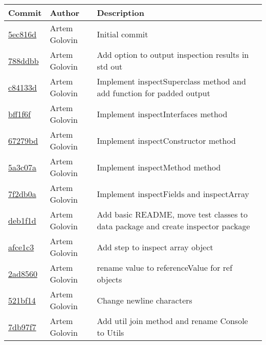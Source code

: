 \begin{tabularx}{\textwidth}{l l X}\textbf{Commit} & \textbf{Author} & \textbf{Description}\\ \hline
\href{https://github.com/awave1/ObjectInspector/commit/5ec816dfc0e519d694f6da56351a2e67b482ec35}{5ec816d} & Artem Golovin & Initial commit\\ \hline
\href{https://github.com/awave1/ObjectInspector/commit/788ddbb7111d9619e219ae982a252e425357aff6}{788ddbb} & Artem Golovin & Add option to output inspection results in std out\\ \hline
\href{https://github.com/awave1/ObjectInspector/commit/c84133d93749d907509d9c70d27e74650d6b5c8c}{c84133d} & Artem Golovin & Implement inspectSuperclass method and add function for padded output\\ \hline
\href{https://github.com/awave1/ObjectInspector/commit/bff1f6f712e252773a3f6a4327aed282ca731384}{bff1f6f} & Artem Golovin & Implement inspectInterfaces method\\ \hline
\href{https://github.com/awave1/ObjectInspector/commit/67279bdb7cc979fa64b62ad9c3ce97f36f95b632}{67279bd} & Artem Golovin & Implement inspectConstructor method\\ \hline
\href{https://github.com/awave1/ObjectInspector/commit/5a3c07a9a640ae8a964eae4e9eed72e891decf44}{5a3c07a} & Artem Golovin & Implement inspectMethod method\\ \hline
\href{https://github.com/awave1/ObjectInspector/commit/7f2db0a58396b9fd2ede3c2b26ffe62950d598d2}{7f2db0a} & Artem Golovin & Implement inspectFields and inspectArray\\ \hline
\href{https://github.com/awave1/ObjectInspector/commit/deb1f1de7e5fc16777c9b73706129ce39fdea906}{deb1f1d} & Artem Golovin & Add basic README, move test classes to data package and create inspector package\\ \hline
\href{https://github.com/awave1/ObjectInspector/commit/afce1c33fb3eec7439dee533fa24dfd92e970780}{afce1c3} & Artem Golovin & Add step to inspect array object\\ \hline
\href{https://github.com/awave1/ObjectInspector/commit/2ad85609a71571066644866f9107f99da4ae5166}{2ad8560} & Artem Golovin & rename value to referenceValue for ref objects\\ \hline
\href{https://github.com/awave1/ObjectInspector/commit/521bf14c5b22ec50dd1e98daf4cb436209d49a3f}{521bf14} & Artem Golovin & Change newline characters\\ \hline
\href{https://github.com/awave1/ObjectInspector/commit/7db97f7b2600395c9b0ee1cbd8e1a8dbabeb5f06}{7db97f7} & Artem Golovin & Add util join method and rename Console to Utils\\ \hline

\end{tabularx}
